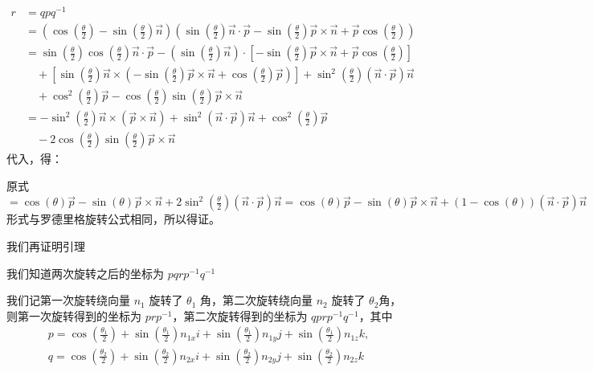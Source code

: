 \documentclass[withoutpreface,bwprint]{cumcmthesis} %
\begin{document}
\[
    \begin{split}
        r &= qpq^{-1} \\ &= (\cos(\frac{\theta}{2}) - 
        \sin(\frac{\theta}{2})\overrightarrow{n})
        (\sin(\frac{\theta}{2})\overrightarrow{n} \cdot \overrightarrow{p} -
        \sin(\frac{\theta}{2})\overrightarrow{p} \times \overrightarrow{n} +
        \overrightarrow{p}\cos(\frac{\theta}{2})) \\ &= \sin(\frac{\theta}{2})
        \cos(\frac{\theta}{2})\overrightarrow{n} \cdot \overrightarrow{p} -
        (\sin(\frac{\theta}{2})\overrightarrow{n}) \cdot
        [-\sin(\frac{\theta}{2})\overrightarrow{p} \times \overrightarrow{n} +
        \overrightarrow{p}\cos(\frac{\theta}{2})] \\ &\quad + 
        [\sin(\frac{\theta}{2})\overrightarrow{n} \times 
        (-\sin(\frac{\theta}{2})\overrightarrow{p} \times \overrightarrow{n} +
        \cos(\frac{\theta}{2})\overrightarrow{p})] + \sin ^2
        (\frac{\theta}{2})(\overrightarrow{n} \cdot \overrightarrow{p})
        \overrightarrow{n} \\ &\quad + \cos ^2(\frac{\theta}{2})\overrightarrow{p} -
        \cos(\frac{\theta}{2})\sin(\frac{\theta}{2})\overrightarrow{p} \times 
        \overrightarrow{n} \\ &= -\sin^2(\frac{\theta}{2})\overrightarrow{n} \times
        (\overrightarrow{p} \times \overrightarrow{n}) +
        \sin^2(\overrightarrow{n} \cdot \overrightarrow{p})\overrightarrow{n} +
        \cos^2(\frac{\theta}{2})\overrightarrow{p} \\ &\quad - 2\cos(\frac{\theta}{2})
        \sin(\frac{\theta}{2})\overrightarrow{p} \times \overrightarrow{n} 
    \end{split}
\]
\phantom{哈哈}代入，得：\par
原式 $= \cos(\theta)\overrightarrow{p} - \sin(\theta)\overrightarrow{p} \times
\overrightarrow{n} + 2\sin^2(\frac{\theta}{2})(\overrightarrow{n} \cdot 
\overrightarrow{p})\overrightarrow{n} = \cos(\theta)\overrightarrow{p} -
\sin(\theta)\overrightarrow{p} \times \overrightarrow{n} +
(1 - \cos(\theta ))(\overrightarrow{n} \cdot \overrightarrow{p})
\overrightarrow{n} $
形式与罗德里格旋转公式相同，所以得证。 \par
我们再证明引理 \par
我们知道两次旋转之后的坐标为 $pqrp^{-1}q^{-1}$ \par
我们记第一次旋转绕向量 $n_1$ 旋转了 $\theta _1$ 角，第二次旋转绕向量 $n_2$ 旋转了 $\theta _2$角，
则第一次旋转得到的坐标为 $prp^{-1}$，第二次旋转得到的坐标为 $qprp^{-1}q^{-1}$，其中
\[
    \begin{split}
        p = \cos(\frac{\theta _1}{2}) + \sin(\frac{\theta _1}{2})n_{1x}i +
        \sin(\frac{\theta _1}{2})n_{1y}j + \sin(\frac{\theta _1}{2})n_{1z}k, \\
        q = \cos(\frac{\theta _2}{2}) + \sin(\frac{\theta _2}{2})n_{2x}i +
        \sin(\frac{\theta _2}{2})n_{2y}j + \sin(\frac{\theta _2}{2})n_{2z}k
    \end{split}
\]
\end{document}
